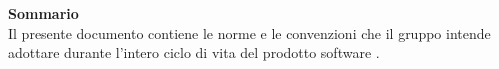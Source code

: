 \Large{\textbf{Sommario}}\\
{
\normalsize
Il presente documento contiene le norme e le convenzioni che il gruppo \textit{\ggt} intende adottare durante l'intero ciclo di vita del prodotto software \textbf{\mytalk}.
}